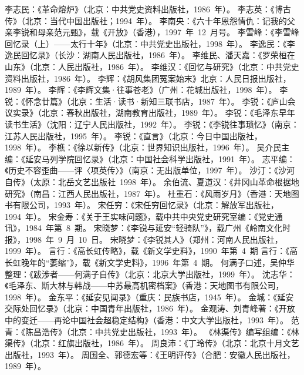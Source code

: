 \begin{thebibliography}{999}
\bibitem{}李志民：《革命熔炉》（北京：中共党史资料出版社，1986~年）。
\bibitem{}李志英：《博古传》（北京：当代中国出版社；1994~年）。
\bibitem{}李南央：《六十年恩怨情仇：记我的父亲李锐和母亲范元甄》，载《开放》（香港），1997~年~12~月号。
\bibitem{}李雪峰：《李雪峰回忆录（上）——太行十年》（北京：中共党史出版社，1998~年）。
\bibitem{}李逸民：《李逸民回忆录》（长沙：湖南人民出版社，1986~年）。
\bibitem{}李维民、潘天嘉：《罗荣桓在山东》（北京：人民出版社，1986~年）。
\bibitem{}李维汉：《回忆与研究》（北京：中共党史资料出版社，1986~年）。
\bibitem{}李辉：《胡风集团冤案始末》北京：人民日报出版社，1989~年）。
\bibitem{}李辉：《李辉文集·往事苍老》（广州：花城出版社，1998~年）。
\bibitem{}李锐：《怀念廿篇》（北京：生活·读书·新知三联书店，1987~年）。
\bibitem{}李锐：《庐山会议实录》（北京：春秋出版社，湖南教育出版社，1989~年）。
\bibitem{}李锐：《毛泽东早年读书生活》（沈阳：辽宁人民出版社，1992~年）。
\bibitem{}李锐：《李锐往事琐忆》（南京：江苏人民出版社，1995~年）。
\bibitem{}李锐：《直言》（北京：今日中国出版社，1998~年）。
\bibitem{}李樵：《徐以新传》（北京：世界知识出版社，1996~年）。
\bibitem{}吴介民主编：《延安马列学院回忆录》（北京：中国社会科学出版社，1991~年）。
\bibitem{}志平编：《历史不容歪曲——评〈项英传〉》（南京：无出版单位，1997~年）。
\bibitem{}沙汀：《沙河自传》（太原：北岳文艺出版社~1998~年）。
\bibitem{}余伯流、夏道汉：《井冈山革命根据地研究》（南昌：江西人民出版社，1987~年）。
\bibitem{}杜重石：《风雨岁月》（香港：天地图书有限公司，1993~年）。
\bibitem{}宋任穷：《宋任穷回忆录》（北京：解放军出版社，1994~年）。
\bibitem{}宋金寿：《关于王实味问题》，载中共中央党史研究室编：《党史通讯》，1984~年第~8~期。
\bibitem{}宋晓梦：《李锐与延安“轻骑队”》，载广州《岭南文化时报》，1998~年~9~月~10~日。
\bibitem{}宋晓梦：《李锐其人》（郑州：河南人民出版社，1999~年）。
\bibitem{}言行：《高长虹传略》，载《新文学史料》，1990~年第~4~期
\bibitem{}言行：《高长虹晚年的“萎缩”》，载《新文学史料》，1996~年第~4~期。
\bibitem{}何满子口述，吴仲华整理：《跋涉者——何满子自传》（北京：北京大学出版社，1999~年）。
\bibitem{}沈志华：《毛泽东、斯大林与韩战——中苏最高机密档案》（香港：天地图书有限公司，1998~年）。
\bibitem{}金东平：《延安见闻录》（重庆：民族书店，1945~年）。
\bibitem{}金城：《延安交际处回忆录》（北京：中国青年出版社，1986~年）。
\bibitem{}金观涛、刘青峰著：《开放中的变迁——再论中国社会超稳定结构》（香港：中文大学出版杜，1993~年）。
\bibitem{}范青：《陈昌浩传》（北京：中共党史出版社，1993~年）。
\bibitem{}《林渠传》编写组编：《林渠传》（北京：红旗出版社，1986~年）。
\bibitem{}周良沛：《丁玲传》（北京：北京十月文艺出版社，1993~年）。
\bibitem{}周国全、郭德宏等：《王明评传》（合肥：安徽人民出版社，1989~年）。

\end{thebibliography}
